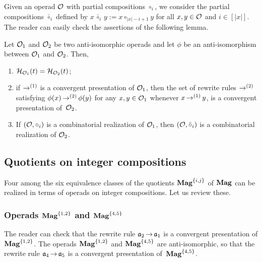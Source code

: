 Given an operad $\mathcal{O}$ with partial compositions $\circ_i$, we consider
the partial compositions $\bar{\circ}_i$ defined by
\begin{math}
  x \, \bar{\circ}_i \, y := x \circ_{|x| - i + 1} y
\end{math}
for all $x, y \in \mathcal{O}$ and $i \in [|x|]$. The reader can easily check
the assertions of the following lemma.

\begin{Lemma} \label{lem:recall_anti_isomorphic}
  Let $\mathcal{O}_1$ and $\mathcal{O}_2$ be two anti-isomorphic operads and let
  $\phi$ be an anti-isomorphism between $\mathcal{O}_1$ and $\mathcal{O}_2$. Then,
    \begin{enumerate}[label={(\it\roman*)}]
        \item \label{item:recall_anti_isomorphic_1}
        $\mathcal{H}_{\mathcal{O}_1}(t) = \mathcal{H}_{\mathcal{O}_2}(t)$;
        \item \label{item:recall_anti_isomorphic_2}
        if $\operatorname{\to}^{(1)}$ is a convergent presentation of
        $\mathcal{O}_1$,
        then the set of rewrite rules $\operatorname{\to}^{(2)}$ satisfying
        $\phi(x) \operatorname{\to}^{(2)} \phi(y)$
        for any $x, y \in \mathcal{O}_1$ whenever
        $x \operatorname{\to}^{(1)} y$,
        is a convergent presentation of~$\mathcal{O}_2$.
      \item\label{item:realization_anti_isomorphic}
        If $\left(\mathcal{O}, \circ_i\right)$ is a combinatorial realization of
        $\mathcal{O}_1$, then
        \begin{math}
          \left(\mathcal{O}, \bar{\circ}_i\right)
        \end{math}
        is a combinatorial realization of $\mathcal{O}_2$.
    \end{enumerate}
\end{Lemma}
\medbreak

\subsection{Quotients on integer compositions}
Four among the six equivalence classes of the quotients
$\mathbf{Mag}^{\{i, j\}}$ of $\mathbf{Mag}$ can be realized in terms of operads on
integer compositions. Let us review these.
\medbreak


\subsubsection{Operads $\mathbf{Mag}^{\{1, 2\}}$ and $\mathbf{Mag}^{\{4, 5\}}$}
\label{subsubsec:Mag_1_2}
The reader can check that the rewrite rule $\mathfrak{a}_2 \operatorname{\to} \mathfrak{a}_1$ is a
convergent presentation of $\mathbf{Mag}^{\{1, 2\}}$. The operads
$\mathbf{Mag}^{\{1, 2\}}$ and $\mathbf{Mag}^{\{4, 5\}}$ are anti-isomorphic, so that the
rewrite rule $\mathfrak{a}_4 \operatorname{\to} \mathfrak{a}_5$ is a convergent presentation
of~$\mathbf{Mag}^{\{4, 5\}}$.
\medbreak


